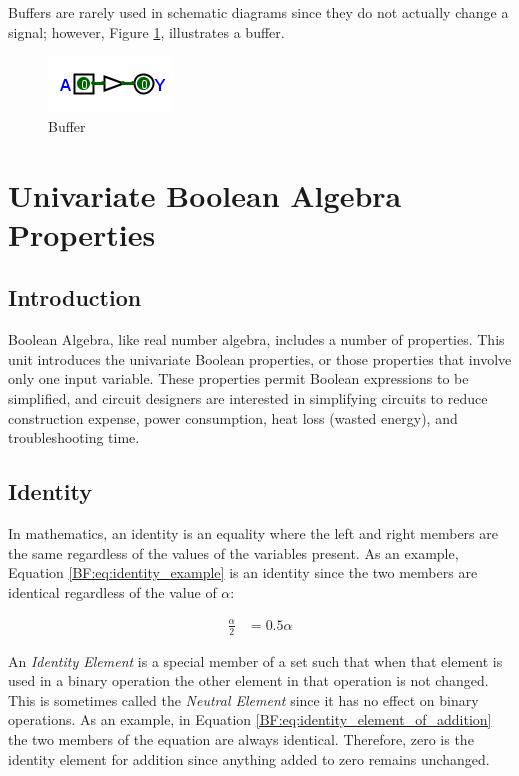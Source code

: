 Buffers are rarely used in schematic diagrams since they do not actually change a signal; however, Figure \ref{fig:04_09}, illustrates a buffer. 

\begin{figure}[H]
	\centering
	\includegraphics[width=\maxwidth{.95\linewidth}]{gfx/04_09}
	\caption{Buffer}
	\label{fig:04_09}
\end{figure}

\section{Univariate Boolean Algebra Properties}
\label{BF:sec:univariate_boolean_algebra_properties}
\subsection{Introduction}
\label{BF:subsec:introduction_to_univariate}

Boolean Algebra, like real number algebra, includes a number of properties. This unit introduces the univariate Boolean properties, or those properties that involve only one input variable. These properties permit Boolean expressions to be simplified, and circuit designers are interested in simplifying circuits to reduce construction expense, power consumption, heat loss (wasted energy), and troubleshooting time.  

\subsection{Identity}
\label{BF:subsec:identity}

In mathematics, an identity is an equality where the left and right members are the same regardless of the values of the variables present. As an example, Equation \ref{BF:eq:identity_example} is an identity since the two members are identical regardless of the value of $ \alpha $:

\begin{align}
  \label{BF:eq:identity_example}
  \frac{\alpha}{2} &= 0.5\alpha
\end{align}

An \emph{Identity Element} is a special member of a set such that when that element is used in a binary operation the other element in that operation is not changed. This is sometimes called the \emph{Neutral Element} since it has no effect on binary operations. As an example, in Equation \ref{BF:eq:identity_element_of_addition} the two members of the equation are always identical. Therefore, zero is the identity element for addition since anything added to zero remains unchanged.

